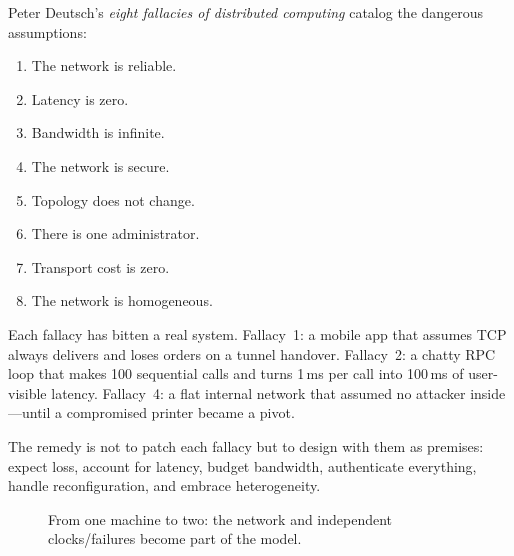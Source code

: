 Peter Deutsch's \emph{eight fallacies of distributed computing} catalog the dangerous assumptions:
\begin{enumerate}[leftmargin=1.4em,itemsep=0.25em]
    \item The network is reliable.
    \item Latency is zero.
    \item Bandwidth is infinite.
    \item The network is secure.
    \item Topology does not change.
    \item There is one administrator.
    \item Transport cost is zero.
    \item The network is homogeneous.
\end{enumerate}
Each fallacy has bitten a real system. Fallacy~1: a mobile app that assumes TCP always delivers and loses orders on a tunnel handover. Fallacy~2: a chatty RPC loop that makes 100 sequential calls and turns 1\,ms per call into 100\,ms of user-visible latency. Fallacy~4: a flat internal network that assumed no attacker inside---until a compromised printer became a pivot.

The remedy is not to patch each fallacy but to design with them as premises: expect loss, account for latency, budget bandwidth, authenticate everything, handle reconfiguration, and embrace heterogeneity.

\begin{figure}[h]
\centering
{}
\caption{From one machine to two: the network and independent clocks/failures become part of the model.}
\label{fig:dist-intro}
\end{figure}

